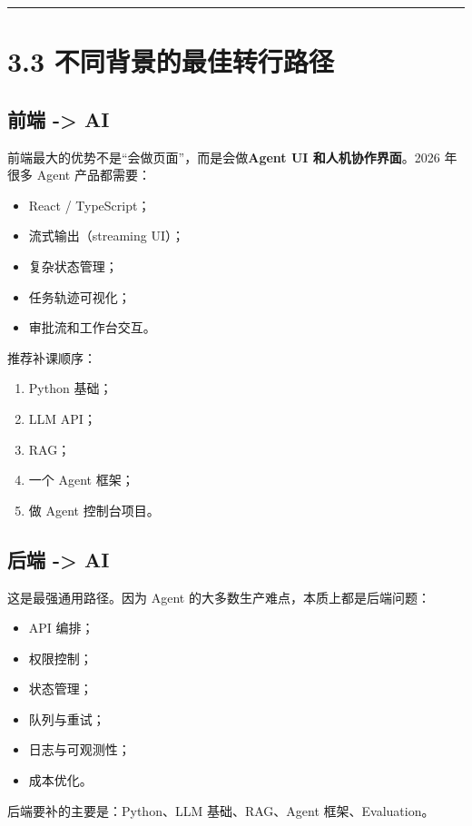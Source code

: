 \bigskip\hrule\bigskip

\section{3.3 不同背景的最佳转行路径}

\subsection{前端 -> AI}

前端最大的优势不是``会做页面''，而是会做\textbf{Agent UI 和人机协作界面}。2026 年很多 Agent 产品都需要：


\begin{itemize}[leftmargin=2em]
\item React / TypeScript；
\item 流式输出（streaming UI）；
\item 复杂状态管理；
\item 任务轨迹可视化；
\item 审批流和工作台交互。
\end{itemize}

推荐补课顺序：


\begin{enumerate}[leftmargin=2em]
\item Python 基础；
\item LLM API；
\item RAG；
\item 一个 Agent 框架；
\item 做 Agent 控制台项目。
\end{enumerate}

\subsection{后端 -> AI}

这是最强通用路径。因为 Agent 的大多数生产难点，本质上都是后端问题：


\begin{itemize}[leftmargin=2em]
\item API 编排；
\item 权限控制；
\item 状态管理；
\item 队列与重试；
\item 日志与可观测性；
\item 成本优化。
\end{itemize}

后端要补的主要是：Python、LLM 基础、RAG、Agent 框架、Evaluation。


